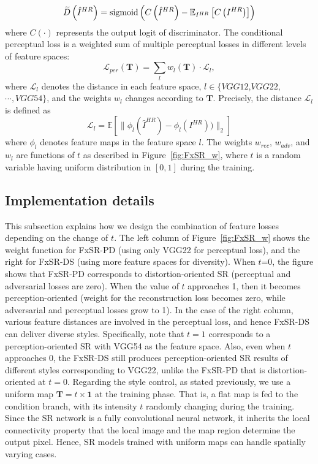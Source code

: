 \documentclass{article}
\begin{document}
\begin{equation}
\footnotesize
\widetilde{D}\left ( \hat{I}^{HR} \right ) = \mathrm{sigmoid} \left ( C\left (  \hat{I}^{HR}\right ) -\mathbb{E}_{{I}^{HR}}\left [ C\left ( {I}^{HR} \right )\right ] \right )
\end{equation}
where $C\left ( \cdot  \right )$ represents the output logit of discriminator.
The conditional perceptual loss is a weighted sum of multiple perceptual losses in different levels of feature spaces:
\begin{equation}
\mathcal{L}_{per}(\mathbf{T})=\sum_{l}{w}_{l}(\mathbf{T})\cdot\mathcal{L}_{l},
\end{equation}
where $\mathcal{L}_{l}$ denotes the distance in each feature space, $l\in \{VGG12$,$VGG22,$ $\cdots,VGG54\}$, and the weights ${w}_{l}$ changes according to $\mathbf{T}$.
Precisely, the distance $\mathcal{L}_{l}$ is defined as
\begin{equation}
\mathcal{L}_{l}=\mathbb{E}\left[\lVert{\phi_{l}(\hat{I}^{HR})-\phi_{l}({I}^{HR}))}\rVert_{2}\right]
\end{equation}
where ${\phi}_{l}$ denotes feature maps in the feature space $l$.
The weights ${w}_{rec}$, ${w}_{adv}$, and ${w}_{l}$ are functions of $t$ as described in Figure~\ref{fig:FxSR_w}, where $t$ is a random variable having uniform distribution in $[0,1]$ during the training.
\subsection{Implementation details}
This subsection explains how we design the combination of feature losses depending on the change of $t$.
The left column of Figure~\ref{fig:FxSR_w} shows the weight function for FxSR-PD (using only VGG22 for perceptual loss), and the right for FxSR-DS (using more feature spaces for diversity).
When $t$=0, the figure shows that FxSR-PD corresponds to distortion-oriented SR (perceptual and adversarial losses are zero). When the value of $t$ approaches 1, then it becomes perception-oriented (weight for the reconstruction loss becomes zero, while adversarial and perceptual losses grow to 1). In the case of the right column, various feature distances are involved in the perceptual loss, and hence FxSR-DS can deliver diverse styles. Specifically, note that $t=1$ corresponds to a perception-oriented SR with VGG54 as the feature space. Also, even when $t$ approaches 0, the FxSR-DS still produces perception-oriented SR results of different styles corresponding to VGG22, unlike the FxSR-PD that is distortion-oriented at $t=0$.
Regarding the style control, as stated previously, we use a uniform map $\mathbf{T} =t \times \mathbf{1}$ at the training phase. That is, a flat map is fed to the condition branch, with its intensity $t$ randomly changing during the training. Since the SR network is a fully convolutional neural network, it inherits the local connectivity property that the local image and the map region determine the output pixel. Hence, SR models trained with uniform maps can handle spatially varying cases. 
\end{document}
